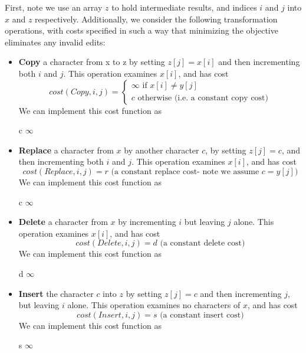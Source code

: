 \documentclass[paper=a4, fontsize=11pt]{scrartcl} %
\numberwithin{equation}{section} %
\numberwithin{figure}{section} %
\numberwithin{table}{section} %
\begin{document}
First, note we use an array $z$ to hold intermediate results, and indices $i$ and $j$ into $x$ and $z$ respectively. Additionally, we consider the following transformation operations, with costs specified in such a way that minimizing the objective eliminates any invalid edits:
\begin{itemize}
\item \textbf{Copy} a character from x to z by setting $z[j] = x[i]$ and then incrementing both $i$ and $j$. This operation examines $x[i]$, and has cost
\[
cost(Copy, i, j) = 
\begin{cases}
\infty \textrm{ if } x[i] \ne y[j] \\
c \textrm{ otherwise (i.e. a constant copy cost)}
\end{cases}
\]
We can implement this cost function as\\
\begin{algorithmic}
	\State \Return c
\Else 
	\State \Return $\infty$
\EndIf
\EndFunction
\end{algorithmic}

\item \textbf{Replace} a character from $x$ by another character $c$, by setting $z[j] = c$, and then incrementing both $i$ and $j$. This operation examines $x[i]$, and has cost
\[
cost(Replace, i, j) = r \textrm{ (a constant replace cost- note we assume } c = y[j])
\]
We can implement this cost function as\\
\begin{algorithmic}
	\State \Return c
\Else 
	\State \Return $\infty$
\EndIf
\EndFunction
\end{algorithmic}

\item \textbf{Delete} a character from $x$ by incrementing $i$ but leaving $j$ alone. This operation examines $x[i]$, and has cost
\[
cost(Delete, i, j) = d \textrm{ (a constant delete cost)}
\]
We can implement this cost function as\\
\begin{algorithmic}
	\State \Return d
\Else 
	\State \Return $\infty$
\EndIf
\EndFunction
\end{algorithmic}

\item \textbf{Insert} the character $c$ into $z$ by setting $z[j] = c$ and then incrementing $j$, but leaving $i$ alone. This operation examines no characters of $x$, and has cost
\[
cost(Insert, i, j) = s \textrm{ (a constant insert cost)}
\]
We can implement this cost function as\\
\begin{algorithmic}
	\State \Return s
\Else 
	\State \Return $\infty$
\EndIf
\EndFunction
\end{algorithmic}


\end{itemize}
\end{document}
